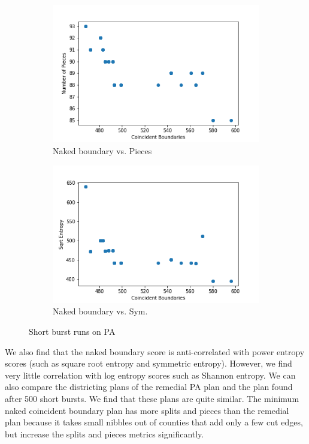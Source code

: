 \documentclass{mgggarticle}
\begin{document}
\begin{figure}[h]
	\begin{subfigure}{0.475\textwidth}
    \centering
    \includegraphics[width=\textwidth]{coin_bound_vs_pieces_5000_10.png}
    \caption{Naked boundary vs. Pieces}
    \end{subfigure}
    	\begin{subfigure}{0.475\textwidth}
\centering
    \includegraphics[width=\textwidth]{coin_bound_vs_power_5_entropy_5000_10.png}
    \caption{Naked boundary vs. Sym.}
\end{subfigure}
\caption{Short burst runs on PA}
\end{figure}

We also find that the naked boundary score is anti-correlated with power entropy scores (such as square root entropy and symmetric entropy). However, we find very little correlation with log entropy scores such as Shannon entropy. We can also compare the districting plans of the remedial PA plan and the plan found after 500 short bursts. We find that these plans are quite similar. The minimum naked coincident boundary plan has more splits and pieces than the remedial plan because it takes small nibbles out of counties that add only a few cut edges, but increase the splits and pieces metrics significantly.
\end{document}
